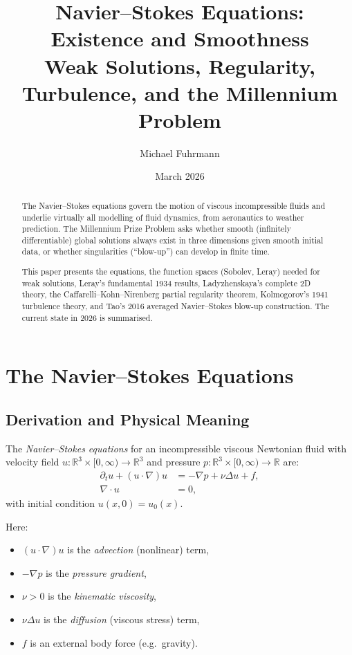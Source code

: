 \documentclass[12pt,a4paper]{article}
\title{\textbf{Navier--Stokes Equations: Existence and Smoothness}\\[0.5em]
\large Weak Solutions, Regularity, Turbulence, and the Millennium Problem}
\author{Michael Fuhrmann}
\date{March 2026}
\theoremstyle{remark}
\begin{document}
\maketitle
\begin{abstract}
The Navier--Stokes equations govern the motion of viscous incompressible fluids and
underlie virtually all modelling of fluid dynamics, from aeronautics to weather prediction.
The Millennium Prize Problem asks whether smooth (infinitely differentiable) global
solutions always exist in three dimensions given smooth initial data, or whether
singularities (``blow-up'') can develop in finite time.

This paper presents the equations, the function spaces (Sobolev, Leray) needed for weak
solutions, Leray's fundamental 1934 results, Ladyzhenskaya's complete 2D theory, the
Caffarelli--Kohn--Nirenberg partial regularity theorem, Kolmogorov's 1941 turbulence
theory, and Tao's 2016 averaged Navier--Stokes blow-up construction.  The current
state in 2026 is summarised.
\end{abstract}

\tableofcontents
\newpage

\section{The Navier--Stokes Equations}

\subsection{Derivation and Physical Meaning}

The \emph{Navier--Stokes equations} for an incompressible viscous Newtonian fluid with
velocity field $u\colon \mathbb{R}^3 \times [0,\infty) \to \mathbb{R}^3$ and pressure
$p\colon \mathbb{R}^3 \times [0,\infty) \to \mathbb{R}$ are:
\begin{align}
  \partial_t u + (u \cdot \nabla)u &= -\nabla p + \nu \Delta u + f, \label{eq:ns_momentum}\\
  \nabla \cdot u &= 0, \label{eq:ns_incompressible}
\end{align}
with initial condition $u(x, 0) = u_0(x)$.

Here:
\begin{itemize}[nosep]
  \item $(u \cdot \nabla)u$ is the \emph{advection} (nonlinear) term,
  \item $-\nabla p$ is the \emph{pressure gradient},
  \item $\nu > 0$ is the \emph{kinematic viscosity},
  \item $\nu \Delta u$ is the \emph{diffusion} (viscous stress) term,
  \item $f$ is an external body force (e.g.\ gravity).
\end{itemize}
\end{document}
